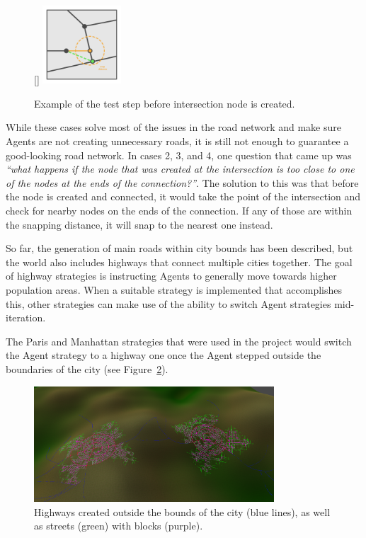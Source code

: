 \begin{figure}
  \centering
  \raisebox{0pt}[\dimexpr{}\baselineskip\relax]{
    \includegraphics[width=0.26\textwidth]{figure/road_intersection_final_test.png}
  }
  \caption{Example of the test step before intersection node is created.}

  \label{fig:road_intersection_final_test}
\end{figure}

While these cases solve most of the issues in the road network and make sure Agents are not creating unnecessary roads, it is still not enough to guarantee a good-looking road network.
In cases 2, 3, and 4, one question that came up was \textit{``what happens if the node that was created at the intersection is too close to one of the nodes at the ends of the connection?''}.
The solution to this was that before the node is created and connected, it would take the point of the intersection and check for nearby nodes on the ends of the connection.
If any of those are within the snapping distance, it will snap to the nearest one instead.


So far, the generation of main roads within city bounds has been described, but the world also includes highways that connect multiple cities together.
The goal of highway strategies is instructing Agents to generally move towards higher population areas.
When a suitable strategy is implemented that accomplishes this, other strategies can make use of the ability to switch Agent strategies mid-iteration.

The Paris and Manhattan strategies that were used in the project would switch the Agent strategy to a highway one once the Agent stepped outside the boundaries of the city (see Figure~\ref{fig:road_highways}).

\begin{figure}[H]
  \centering

  \includegraphics[width=0.8\textwidth]{figure/road_highways.png}
  \caption{Highways created outside the bounds of the city (blue lines), as well as streets (green) with blocks (purple).}

  \label{fig:road_highways}
\end{figure}


